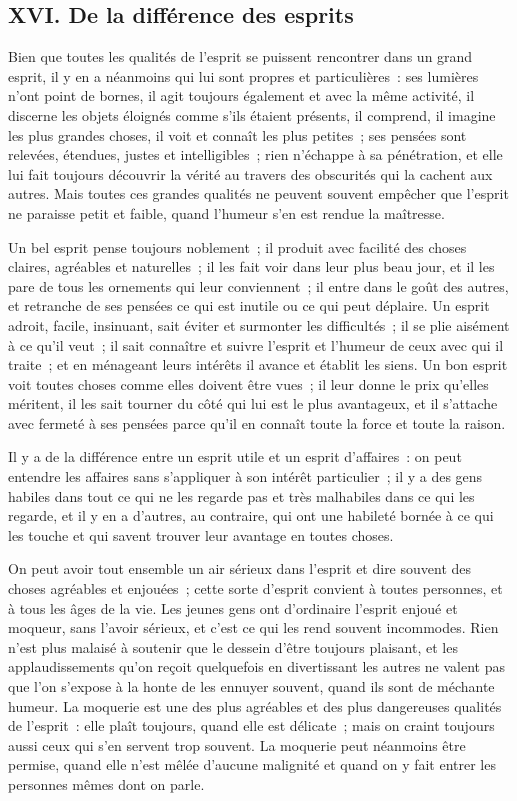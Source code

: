 \documentclass[french,twoside]{book} %
\begin{document}
\subsection[{XVI. De la différence des esprits}]{XVI. De la différence des esprits}
\noindent Bien que toutes les qualités de l’esprit se puissent rencontrer dans un grand esprit, il y en a néanmoins qui lui sont propres et particulières : ses lumières n’ont point de bornes, il agit toujours également et avec la même activité, il discerne les objets éloignés comme s’ils étaient présents, il comprend, il imagine les plus grandes choses, il voit et connaît les plus petites ; ses pensées sont relevées, étendues, justes et intelligibles ; rien n’échappe à sa pénétration, et elle lui fait toujours découvrir la vérité au travers des obscurités qui la cachent aux autres. Mais toutes ces grandes qualités ne peuvent souvent empêcher que l’esprit ne paraisse petit et faible, quand l’humeur s’en est rendue la maîtresse.\par
Un bel esprit pense toujours noblement ; il produit avec facilité des choses claires, agréables et naturelles ; il les fait voir dans leur plus beau jour, et il les pare de tous les ornements qui leur conviennent ; il entre dans le goût des autres, et retranche de ses pensées ce qui est inutile ou ce qui peut déplaire. Un esprit adroit, facile, insinuant, sait éviter et surmonter les difficultés ; il se plie aisément à ce qu’il veut ; il sait connaître et suivre l’esprit et l’humeur de ceux avec qui il traite ; et en ménageant leurs intérêts il avance et établit les siens. Un bon esprit voit toutes choses comme elles doivent être vues ; il leur donne le prix qu’elles méritent, il les sait tourner du côté qui lui est le plus avantageux, et il s’attache avec fermeté à ses pensées parce qu’il en connaît toute la force et toute la raison.\par
Il y a de la différence entre un esprit utile et un esprit d’affaires : on peut entendre les affaires sans s’appliquer à son intérêt particulier ; il y a des gens habiles dans tout ce qui ne les regarde pas et très malhabiles dans ce qui les regarde, et il y en a d’autres, au contraire, qui ont une habileté bornée à ce qui les touche et qui savent trouver leur avantage en toutes choses.\par
On peut avoir tout ensemble un air sérieux dans l’esprit et dire souvent des choses agréables et enjouées ; cette sorte d’esprit convient à toutes personnes, et à tous les âges de la vie. Les jeunes gens ont d’ordinaire l’esprit enjoué et moqueur, sans l’avoir sérieux, et c’est ce qui les rend souvent incommodes. Rien n’est plus malaisé à soutenir que le dessein d’être toujours plaisant, et les applaudissements qu’on reçoit quelquefois en divertissant les autres ne valent pas que l’on s’expose à la honte de les ennuyer souvent, quand ils sont de méchante humeur. La moquerie est une des plus agréables et des plus dangereuses qualités de l’esprit : elle plaît toujours, quand elle est délicate ; mais on craint toujours aussi ceux qui s’en servent trop souvent. La moquerie peut néanmoins être permise, quand elle n’est mêlée d’aucune malignité et quand on y fait entrer les personnes mêmes dont on parle.\par
\end{document}
